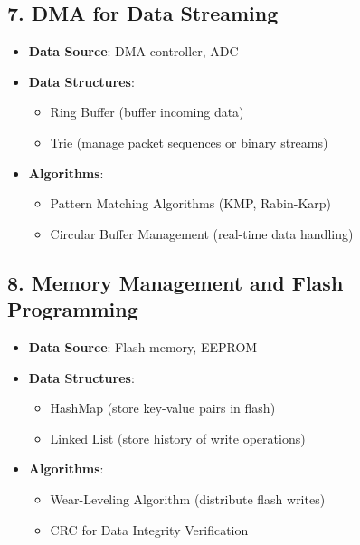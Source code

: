 \documentclass{article}
\begin{document}
\subsection{7. DMA for Data Streaming}
\begin{itemize}
    \item \textbf{Data Source}: DMA controller, ADC
    \item \textbf{Data Structures}:
    \begin{itemize}
        \item Ring Buffer (buffer incoming data)
        \item Trie (manage packet sequences or binary streams)
    \end{itemize}
    \item \textbf{Algorithms}:
    \begin{itemize}
        \item Pattern Matching Algorithms (KMP, Rabin-Karp)
        \item Circular Buffer Management (real-time data handling)
    \end{itemize}
\end{itemize}

\subsection{8. Memory Management and Flash Programming}
\begin{itemize}
    \item \textbf{Data Source}: Flash memory, EEPROM
    \item \textbf{Data Structures}:
    \begin{itemize}
        \item HashMap (store key-value pairs in flash)
        \item Linked List (store history of write operations)
    \end{itemize}
    \item \textbf{Algorithms}:
    \begin{itemize}
        \item Wear-Leveling Algorithm (distribute flash writes)
        \item CRC for Data Integrity Verification
    \end{itemize}
\end{itemize}
\end{document}
